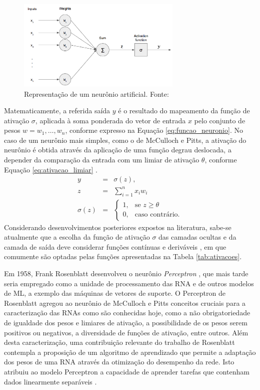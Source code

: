 \begin{figure}[!ht]
	\centering
	\caption{Representação de um neurônio artificial. Fonte: \cite{neuronio:perceptron}}
	\label{fig:neuronio}
	\includegraphics[width=0.7\textwidth]{img/perceptron.png}
\end{figure}
Matematicamente, a referida saída $y$ é o resultado do mapeamento da função de ativação $\sigma$, aplicada à soma ponderada do vetor de entrada $x$ pelo conjunto de pesos $w = w_1, \ldots, w_n$,  conforme expresso na Equação \ref{eq:funcao_neuronio}. No caso de um neurônio mais simples, como o de McCulloch e Pitts, a ativação do neurônio é obtida através da aplicação de uma função degrau deslocada, a depender da comparação da entrada com um limiar de ativação $\theta$, conforme Equação \ref{eq:ativacao_limiar} \cite{mcculloch1943logical}.
\begin{eqnarray}
	y &=& \sigma\left( z\right),\label{eq:funcao_neuronio}\\
	z &=& \sum_{i=1}^n x_i w_i\\
	\sigma(z) &=& \begin{cases}
		1, & \text{se } z \geq \theta\label{eq:ativacao_limiar}\\
		0, & \text{caso contrário.}
	\end{cases}
\end{eqnarray}
Considerando desenvolvimentos posteriores expostos na literatura, sabe-se atualmente que a escolha da função de ativação $\sigma$ das camadas ocultas e da camada de saída deve considerar funções contínuas e deriváveis \cite{hornik1991approximation}, em que comumente são optadas pelas funções apresentadas na Tabela  \ref{tab:ativacoes}.

 

Em 1958, Frank Rosenblatt desenvolveu o neurônio \emph{Perceptron} \cite{rosenblatt1958perceptron}, que mais tarde seria empregado como a unidade de processamento das RNA e de outros modelos de ML, a exemplo das máquinas de vetores de suporte. O Perceptron de Rosenblatt agregou ao neurônio de McCulloch e Pitts conceitos cruciais para a caracterização das RNAs como são conhecidas hoje, como a não obrigatoriedade de igualdade dos pesos e limiares de ativação, a possibilidade de os pesos serem positivos ou negativos, a diversidade de funções de ativação, entre outros. Além desta caracterização, uma contribuição relevante do trabalho de Rosenblatt contempla a proposição de um algoritmo de aprendizado que permite a adaptação dos pesos de uma RNA através da otimização do desempenho da rede. Isto atribuiu ao modelo Perceptron a capacidade de aprender tarefas que contenham dados linearmente separáveis \cite{Teresa:Livro}.

